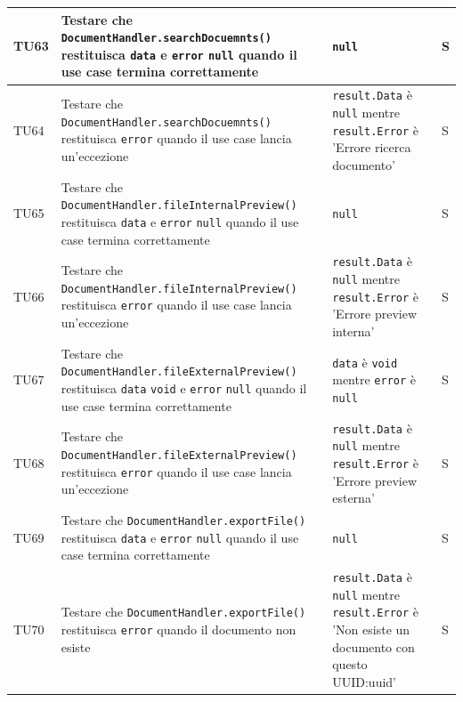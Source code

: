 \documentclass[a4paper,12pt]{article}
\begin{document}
\begin{longtable}{|M{1.2cm}|M{5cm}|M{7cm}|M{1.5cm}|}
            TU63 & Testare che \texttt{DocumentHandler.searchDocuemnts()} restituisca \texttt{data} e \texttt{error} \texttt{null} quando il use case termina correttamente & \texttt{null} & S \\
            \hline

            TU64 & Testare che \texttt{DocumentHandler.searchDocuemnts()} restituisca \texttt{error} quando il use case lancia un'eccezione & \texttt{result.Data} è \texttt{null} mentre \texttt{result.Error} è 'Errore ricerca documento' & S \\
            \hline

            TU65 & Testare che \texttt{DocumentHandler.fileInternalPreview()} restituisca \texttt{data} e \texttt{error} \texttt{null} quando il use case termina correttamente & \texttt{null} & S \\
            \hline

            TU66 & Testare che \texttt{DocumentHandler.fileInternalPreview()} restituisca \texttt{error} quando il use case lancia un'eccezione & \texttt{result.Data} è \texttt{null} mentre \texttt{result.Error} è 'Errore preview interna' & S \\
            \hline

            TU67 & Testare che \texttt{DocumentHandler.fileExternalPreview()} restituisca \texttt{data} \texttt{void} e \texttt{error} \texttt{null} quando il use case termina correttamente & \texttt{data} è \texttt{void} mentre \texttt{error} è \texttt{null} & S \\
            \hline

            TU68 & Testare che \texttt{DocumentHandler.fileExternalPreview()} restituisca \texttt{error} quando il use case lancia un'eccezione & \texttt{result.Data} è \texttt{null} mentre \texttt{result.Error} è 'Errore preview esterna' & S \\
            \hline

            TU69 & Testare che \texttt{DocumentHandler.exportFile()} restituisca \texttt{data} e \texttt{error} \texttt{null} quando il use case termina correttamente & \texttt{null} & S \\
            \hline

            TU70 & Testare che \texttt{DocumentHandler.exportFile()} restituisca \texttt{error} quando il documento non esiste & \texttt{result.Data} è \texttt{null} mentre \texttt{result.Error} è 'Non esiste un documento con questo UUID:uuid' & S \\
            \hline


\end{longtable}
\end{document}
